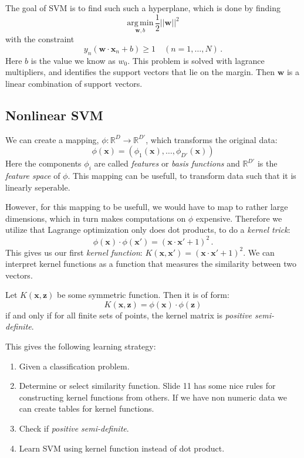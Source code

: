 The goal of SVM is to find such such a hyperplane, which is done by finding
\[
    \underset{\mathbf{w}, b}{\mathrm{arg}\,\mathrm{min}}\,\frac 1 2 ||\mathbf{w}||^2
\]
with the constraint
\[
    y_n(\mathbf{w} \cdot \mathbf{x}_n + b) \geq 1 \quad (n = 1, \dots, N)\,.
\]
Here $b$ is the value we know as $w_0$.
This problem is solved with lagrance multipliers, and identifies the support vectors that lie on the margin.
Then $\mathbf{w}$ is a linear combination of support vectors.

\subsection{Nonlinear SVM}

We can create a mapping, $\phi : \mathbb{R}^D \rightarrow \mathbb{R}^{D'}$, which transforms the original data:
\[
    \phi(\mathbf{x}) = (\phi_1(\mathbf{x}), \dots, \phi_{D'}(\mathbf{x}))
\]
Here the components $\phi_i$ are called \emph{features} or \emph{basis functions} and $\mathbb{R}^{D'}$ is the \emph{feature space} of $\phi$.
This mapping can be usefull, to transform data such that it is linearly seperable.

However, for this mapping to be usefull, we would have to map to rather large dimensions, which in turn makes computations on $\phi$ expensive.
Therefore we utilize that Lagrange optimization only does dot products, to do a \emph{kernel trick}:
\[
    \phi(\mathbf{x}) \cdot \phi(\mathbf{x'}) = (\mathbf{x} \cdot \mathbf{x'} + 1)^2\,.
\]
This gives us our first \emph{kernel function}: $K(\mathbf{x}, \mathbf{x'}) = (\mathbf{x} \cdot \mathbf{x'} + 1)^2$.
We can interpret kernel functions as a function that measures the similarity between two vectors.

\begin{mdframed}[frametitle=Mercer's Theorem]
    Let $K(\mathbf{x}, \mathbf{z})$ be some symmetric function.
    Then it is of form:
    \[
        K(\mathbf{x}, \mathbf{z}) = \phi(\mathbf{x}) \cdot \phi(\mathbf{z})
    \]
    if and only if for all finite sets of points, the kernel matrix is \emph{positive semi-definite}.
\end{mdframed}

This gives the following learning strategy:
\begin{enumerate}
    \item Given a classification problem.
    \item Determine or select similarity function.
        Slide 11 has some nice rules for constructing kernel functions from others.
        If we have non numeric data we can create tables for kernel functions.
    \item Check if \emph{positive semi-definite}.
    \item Learn SVM using kernel function instead of dot product.
\end{enumerate}


